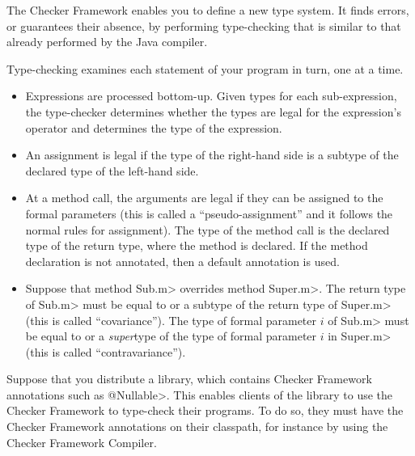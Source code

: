 


The Checker Framework enables you to define a new type system.  It finds
errors, or guarantees their absence, by performing type-checking that is
similar to that already performed by the Java compiler.

Type-checking examines each statement of your program in turn, one at a time.
\begin{itemize}
\item
Expressions are processed bottom-up.  Given types for each sub-expression,
the type-checker determines whether the types are legal for the
expression's operator and determines the type of the expression.

\item
An assignment is legal if the type of the right-hand side is a subtype of
the declared type of the left-hand side.

\item
 At a method call, the arguments are legal if they can be assigned to the
 formal parameters (this is called a ``pseudo-assignment'' and it follows
 the normal rules for assignment).  The type of the method call is the
 declared type of the return type, where the method is declared.  If
 the method declaration is not annotated, then a default annotation is
 used.

\item
  Suppose that method \<Sub.m> overrides method \<Super.m>.
  The return type of \<Sub.m> must be equal to or a subtype of the return
  type of \<Super.m> (this is called ``covariance'').
  The type of formal parameter $i$ of \<Sub.m> must be equal to or a
  \emph{super}type of the type of formal parameter $i$ in \<Super.m> (this
  is called ``contravariance'').

\end{itemize}



Suppose that you distribute a library, which contains Checker Framework
annotations such as \<@Nullable>.  This enables clients of the library to
use the Checker Framework to type-check their programs.  To do so, they
must have the Checker Framework annotations on their classpath, for
instance by using the Checker Framework Compiler.

